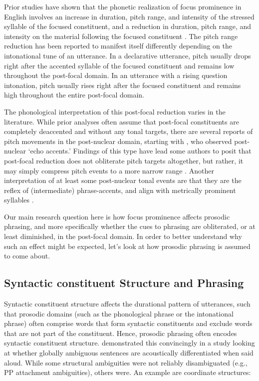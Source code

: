 \documentclass[preprint,review,12pt,authoryear,times]{elsarticle}
\begin{document}
Prior studies have shown that the  phonetic realization of focus prominence in English involves an increase in duration, pitch range, and intensity of the stressed syllable of the focused constituent, and a reduction in duration, pitch range, and intensity on the material following the focused constituent \citep[][i.a.]{coope85, eady86, breenetal10}. The pitch range reduction has been reported to manifest itself differently depending on the intonational tune of an utterance. In a declarative utterance, pitch usually drops right after the accented syllable of the focused constituent and remains low throughout the post-focal domain. In an utterance with a rising question intonation, pitch usually rises right after the focused constituent and remains high throughout the entire post-focal domain. 

The phonological interpretation of this post-focal reduction varies in the literature. While prior analyses often assume that post-focal constituents are completely deaccented and without any tonal targets, there are several reports of pitch movements in the post-nuclear domain, starting with \citet[223]{pierr80}, who observed post-nuclear `echo accents.' Findings of this type  have lead some authors to posit that post-focal reduction does not obliterate pitch targets altogether, but rather, it may simply compress pitch events to a more narrow range \citep[e.g.][]{sugah03, ishih03, ishih16, kugle17}.  Another interpretation of at least some post-nuclear tonal events are that they are the reflex of (intermediate) phrase-accents, and align with metrically prominent syllables \citep[see][for a detailed discussion of phrase accents]{grice00}.

Our main research question here is how focus prominence affects prosodic phrasing, and more specifically whether the cues to phrasing are obliterated, or at least diminished, in the post-focal domain. In order to better understand why such an effect might be expected, let's look at how prosodic phrasing is assumed to come about. 


\subsection{Syntactic constituent Structure and Phrasing}

Syntactic constituent structure affects the durational pattern of utterances, such that prosodic domains (such as the phonological phrase or the intonational phrase) often comprise words that form syntactic constituents and exclude words that are not part of the constituent. Hence, prosodic phrasing often encodes syntactic constituent structure. \citet{lehis73} demonstrated this convincingly in a study looking at whether globally ambiguous sentences are acoustically differentiated when said aloud. While some structural ambiguities were not reliably disambiguated (e.g., PP attachment ambiguities), others were. An example are coordinate structures:
\end{document}
